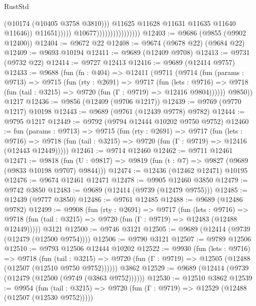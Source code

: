 \begin{lexlean}{RustStd}
\begin{coremodule}
                                                    (@10174 (@10405 @3758 @3810)))
                                                  @11625
                                                  @11628
                                                  @11631
                                                  @11635
                                                  @11640
                                                  @11646))
                                              @11651)))))
                                    @10677))))))))))))))))
@12403 := @9686 (@9855 (@9902 @12400))
@12404 := @9672 @22
@12408 := @9674 (@9678 @22) (@9684 @22)
@12409 := @9693 @10194
@12411 := @9689 (@12409 @9708)
@12413 := @9731 (@9732 @22)
@12414 := @9727 @12413
@12416 := @9689 (@12414 @9757)
@12433 := @9688
    (fun (fn : @404) =>
    @12411
      (@9711
        (@9714
          (fun (params : @9713) =>
          @9715
            (fun (rty : @2691) =>
            @9717
              (fun (lets : @9716) =>
              @9718 (fun (tail : @3215) => @9720 (fun (Γ : @9719) => @12416 @9804))))))
        @9850))
    @1217
@12436 := @9856 (@12409 (@9706 @1217))
@12439 := @9769 (@9770 @1217) @10198
@12443 := @9689 (@9761 (@12439 @9778) @9782)
@12444 := @9795 @1217
@12449 := @9792 (@9794 @12444 @10202 @9750 @9752)
@12460 := fun (params : @9713) =>
  @9715
    (fun (rty : @2691) =>
    @9717
      (fun (lets : @9716) =>
      @9718 (fun (tail : @3215) => @9720 (fun (Γ : @9719) => @12416 (@12443 @12449)))))
@12461 := @9714 @12460
@12462 := @9711 @12461
@12471 := @9818
    (fun (U : @9817) => @9819 (fun (t : @7) => @9827 (@9689 (@9833 @10198 @9707) @9844)))
@12474 := @12436 (@12462 @12471) @10195
@12476 := @9674 @12461 @12471
@12478 := @9905 @12460 @3850
@12479 := @9742 @3850
@12483 := @9689 (@12414 (@9739 (@12479 @9755)))
@12485 := @12439 (@9777 @3850)
@12486 := @9761 @12485
@12488 := @9689 (@12486 @9782)
@12499 := @9908
    (fun (rty : @2691) =>
    @9717
      (fun (lets : @9716) =>
      @9718 (fun (tail : @3215) => @9720 (fun (Γ : @9719) => @12483 (@12488 @12449)))))
    @3121
@12500 := @9746 @3121
@12505 := @9689 (@12414 (@9739 (@12479 (@12500 @9754))))
@12506 := @9790 @3121
@12507 := @9789 @12506
@12510 := @9793 @12506 @12444 @10202
@12522 := @9930
    (fun (lets : @9716) =>
    @9718
      (fun (tail : @3215) =>
      @9720 (fun (Γ : @9719) => @12505 (@12488 (@12507 (@12510 @9750 @9752))))))
    @3862
@12529 := @9689 (@12414 (@9739 (@12479 (@12500 (@9749 (@3863 @9752))))))
@12530 := @12510 @3862
@12539 := @9954
    (fun (tail : @3215) => @9720 (fun (Γ : @9719) => @12529 (@12488 (@12507 (@12530 @9752)))))

\end{coremodule}
\end{lexlean}
